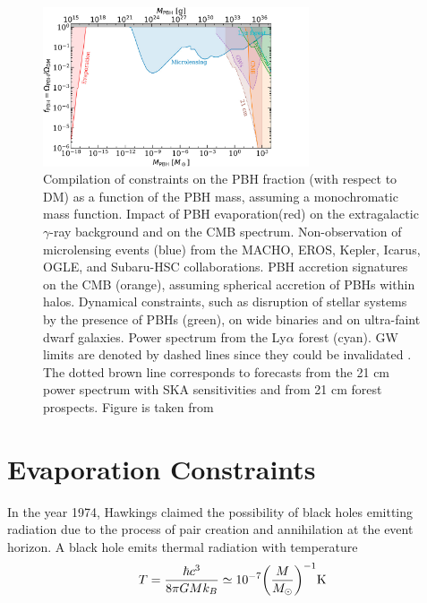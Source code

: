 \begin{figure}[h]
    \centering
    \includegraphics[width=0.7\textwidth]{Constraints.png}
    \caption{Compilation of constraints on the PBH fraction (with respect
to DM) as a function of the PBH mass, assuming a monochromatic mass
function. Impact of PBH evaporation(red) on the extragalactic $\gamma$-ray background  and on the CMB spectrum. Non-observation of microlensing events
(blue) from the MACHO, EROS, Kepler, Icarus, OGLE,  and Subaru-HSC collaborations. PBH accretion signatures on the CMB (orange), assuming spherical accretion of PBHs within
halos. Dynamical constraints, such as disruption of stellar
systems by the presence of PBHs (green), on wide binaries and on ultra-faint dwarf galaxies.
Power spectrum from the Ly$\alpha$ forest (cyan). GW limits are denoted by dashed lines since they could be invalidated \cite{2021JCAP...03..078B}. The dotted brown line corresponds to forecasts from the 21 cm power spectrum with SKA sensitivities \cite{Mena:2019nhm} and from 21 cm forest prospects. Figure is taken from \cite{Villanueva-Domingo:2021spv}}
    \label{fig:4.1} 
\end{figure}


\section{Evaporation Constraints}
In the year 1974, Hawkings\cite{1974Natur.248...30H} \cite{Hawking:1975vcx} claimed the possibility of black holes emitting radiation due to the process of pair creation and annihilation at the event horizon. A black hole emits thermal radiation with temperature
\begin{align}
      T = \frac{\hbar c^{3}}{8\pi G M k_{B}} \simeq 10^{-7} \qty(\frac{M}{M_{\odot}})^{-1} \mathrm{K} \label{4.1}
\end{align}
  

